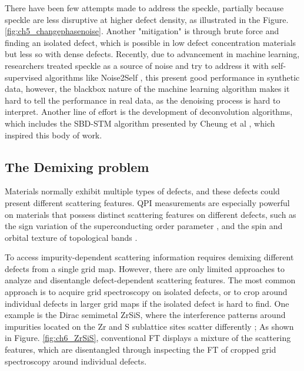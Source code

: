 There have been few attempts made to address the speckle, partially because speckle are less disruptive at higher defect density, as illustrated in the Figure. \ref{fig:ch5_changephasenoise}. Another "mitigation" is through brute force and finding an isolated defect, which is possible in low defect concentration materials but less so with dense defects. Recently, due to advancement in machine learning, researchers treated speckle as a source of noise and try to address it with self-supervised algorithms like Noise2Self \cite{kuijfSelfsupervisedLearningDenoising2025}, this present good performance in synthetic data, however, the blackbox nature of the machine learning algorithm makes it hard to tell the performance in real data, as the denoising process is hard to interpret. Another line of effort is the development of deconvolution algorithms, which includes the SBD-STM algorithm presented by Cheung et al \cite{cheungDictionaryLearningFouriertransform2020}, which inspired this body of work.
 

\subsection{The Demixing problem}
Materials normally exhibit multiple types of defects, and these defects could present different scattering features. QPI measurements are especially powerful on materials that possess distinct scattering features on different defects, such as the sign variation of the superconducting order parameter \cite{chiSignInversionSuperconducting2014}, and the spin and orbital texture of topological bands \cite{yinProbingTopologicalQuantum2021}\cite{butlerQuasiparticleInterferenceZrSiS2017}. 

To access impurity-dependent scattering information requires demixing different defects from a single grid map. However, there are only limited approaches to analyze and disentangle defect-dependent scattering features. The most common approach is to acquire grid spectroscopy on isolated defects, or to crop around individual defects in larger grid maps if the isolated defect is hard to find. One example is the Dirac semimetal ZrSiS, where the interference patterns around impurities located on the Zr and S sublattice sites scatter differently \cite{butlerQuasiparticleInterferenceZrSiS2017}; As shown in Figure. \ref{fig:ch6_ZrSiS}, conventional \ac{FT} displays a mixture of the scattering features, which are disentangled through inspecting the \ac{FT} of cropped grid spectroscopy around individual defects. 

